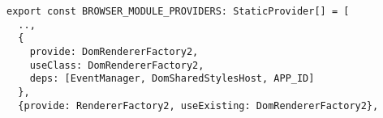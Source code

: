 \begin{verbatim}
export const BROWSER_MODULE_PROVIDERS: StaticProvider[] = [
  ..,
  {
    provide: DomRendererFactory2,
    useClass: DomRendererFactory2,
    deps: [EventManager, DomSharedStylesHost, APP_ID]
  },
  {provide: RendererFactory2, useExisting: DomRendererFactory2},
\end{verbatim}
